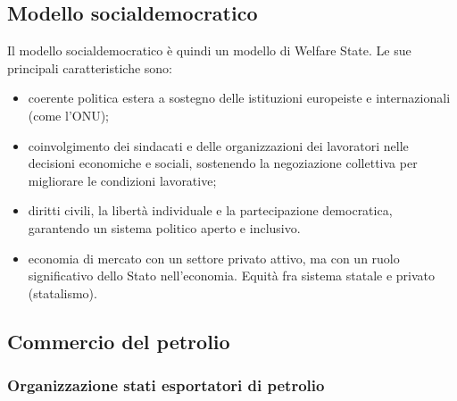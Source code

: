 \documentclass[a4paper]{article}
\begin{document}
\subsection{Modello socialdemocratico}



Il modello socialdemocratico è quindi un modello di Welfare State.
Le sue principali caratteristiche sono:
\begin{itemize}
    \item coerente politica estera a sostegno delle istituzioni europeiste e internazionali (come l'ONU);
    \item coinvolgimento dei sindacati e delle organizzazioni dei lavoratori nelle decisioni economiche e sociali, sostenendo la negoziazione collettiva per migliorare le condizioni lavorative;
    \item diritti civili, la libertà individuale e la partecipazione democratica, garantendo un sistema politico aperto e inclusivo.
    \item economia di mercato con un settore privato attivo, ma con un ruolo significativo dello Stato nell'economia.
        Equità fra sistema statale e privato (statalismo).
\end{itemize}

\subsection{Commercio del petrolio}

\subsubsection{Organizzazione stati esportatori di petrolio}

\end{document}
